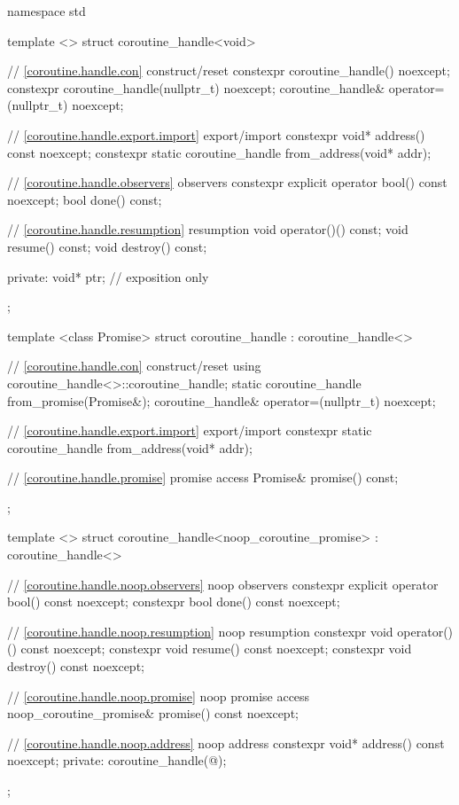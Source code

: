 %
\begin{codeblock}
namespace std {
  template <>
  struct coroutine_handle<void>
  {
    // \ref{coroutine.handle.con} construct/reset
    constexpr coroutine_handle() noexcept;		
    constexpr coroutine_handle(nullptr_t) noexcept;
    coroutine_handle& operator=(nullptr_t) noexcept;
    
    // \ref{coroutine.handle.export.import} export/import
    constexpr void* address() const noexcept;
    constexpr static coroutine_handle from_address(void* addr);
    
    // \ref{coroutine.handle.observers} observers
    constexpr explicit operator bool() const noexcept;
    bool done() const; 
    
    // \ref{coroutine.handle.resumption} resumption
    void operator()() const;
    void resume() const;
    void destroy() const;
    
  private:
    void* ptr; // exposition only
  };

  template <class Promise>
  struct coroutine_handle : coroutine_handle<>
  {
    // \ref{coroutine.handle.con} construct/reset
    using coroutine_handle<>::coroutine_handle;
    static coroutine_handle from_promise(Promise&);		
    coroutine_handle& operator=(nullptr_t) noexcept;

    // \ref{coroutine.handle.export.import} export/import
    constexpr static coroutine_handle from_address(void* addr);
    
    // \ref{coroutine.handle.promise} promise access
    Promise& promise() const;
  };

  template <> struct coroutine_handle<noop_coroutine_promise> : coroutine_handle<>
  {
    // \ref{coroutine.handle.noop.observers} noop observers
    constexpr explicit operator bool() const noexcept;
    constexpr bool done() const noexcept;

    // \ref{coroutine.handle.noop.resumption} noop resumption
    constexpr void operator()() const noexcept;
    constexpr void resume() const noexcept;
    constexpr void destroy() const noexcept;

    // \ref{coroutine.handle.noop.promise} noop promise access
    noop_coroutine_promise& promise() const noexcept;

    // \ref{coroutine.handle.noop.address} noop address
    constexpr void* address() const noexcept;
  private:
    coroutine_handle(@\unspec@);
  };
}
\end{codeblock}

